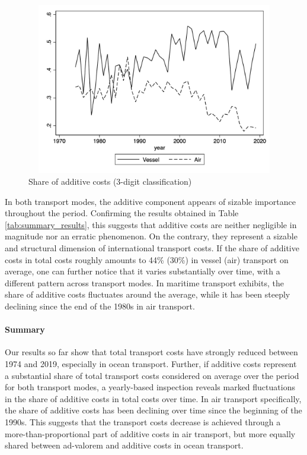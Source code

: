\documentclass[a4paper,11pt]{article}
\begin{document}
\begin{figure}[htbp]
\caption{Share of additive costs (3-digit classification)}
\label{fig:part_cout_additif}
\begin{center}
 \includegraphics[width=12cm, height=7.5cm]{Figure1_share_of_additive_in_totalTC.jpg}
\end{center}
\end{figure}


In both transport modes, the additive component appears of sizable importance throughout the period.
Confirming the results obtained in Table \ref{tab:summary_results}, this suggests that additive costs are neither negligible in magnitude nor an erratic phenomenon.
On the contrary, they represent a sizable and structural dimension of international transport costs.
If the share of additive costs in total costs roughly amounts to 44\% (30\%) in vessel (air) transport on average, one can further notice that it varies substantially over time, with a different pattern across transport modes. In maritime transport exhibits, the share of additive costs fluctuates around the average, while it has been steeply declining since the end of the 1980s in air transport.

\paragraph{Summary} Our results so far show that total transport costs have strongly reduced between 1974 and 2019, especially in ocean transport. Further, if additive costs represent a substantial share of total transport costs considered on average over the period for both transport modes, a yearly-based inspection reveals marked fluctuations in the share of additive costs in total costs over time. In air transport specifically, the share of additive costs has been declining over time since the beginning of the 1990s. This suggests that the transport costs decrease is achieved through a more-than-proportional part of additive costs in air transport, but more equally shared between ad-valorem and additive costs in ocean transport.
\end{document}
